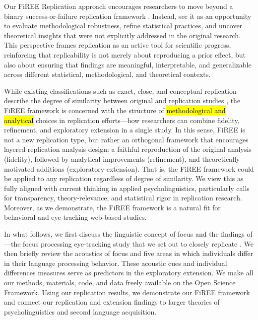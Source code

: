 Our FiREE Replication approach encourages researchers to move beyond a binary success-or-failure replication framework \parencite{Nosek_Errington2020}. Instead, see it as an opportunity to evaluate methodological robustness, refine statistical practices, and uncover theoretical insights that were not explicitly addressed in the original research. This perspective frames replication as an active tool for scientific progress, reinforcing that replicability is not merely about reproducing a prior effect, but also about ensuring that findings are meaningful, interpretable, and generalizable across different statistical, methodological, and theoretical contexts.

While existing classifications such as exact, close, and conceptual replication describe the degree of similarity between original and replication studies \parencite{marsden2018, porte2018, mcmanus2024replication2}, the FiREE framework is concerned with the structure of \hl{methodological and analytical} choices in replication efforts—how researchers can combine fidelity, refinement, and exploratory extension in a single study. In this sense, FiREE is not a new replication type, but rather an orthogonal framework that encourages layered replication analysis design: a faithful reproduction of the original analysis (fidelity), followed by analytical improvements (refinement), and theoretically motivated additions (exploratory extension). That is, the FiREE framework could be applied to any replication regardless of degree of similarity. We view this as fully aligned with current thinking in applied psycholinguistics, particularly calls for transparency, theory-relevance, and statistical rigor in replication research. Moreover, as we demonstrate, the FiREE framework is a natural fit for behavioral and eye-tracking web-based studies.

In what follows, we first discuss the linguistic concept of focus and the findings of \textcite{ge2021a}---the focus processing eye-tracking study that we set out to closely replicate \parencite[see figure 1 of replication classification types][]{mcmanus2024replication2}. We then briefly review the acoustics of focus and five areas in which individuals differ in their language processing behavior. These acoustic cues and individual differences measures serve as predictors in the exploratory extension. We make all our methods, materials, code, and data freely available on the Open Science Framework. Using our \textcite{ge2021a} replication results, we demonstrate our FiREE framework and connect our replication and extension findings to larger theories of psycholinguistics and second language acquisition. 

